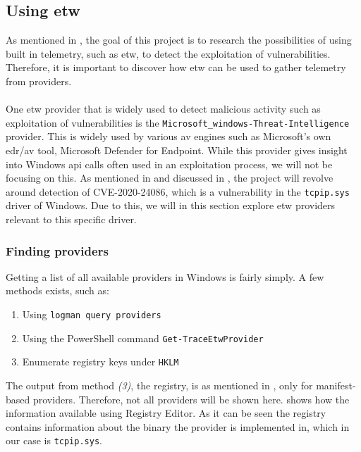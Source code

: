 \documentclass{report}
\begin{document}
\subsection{Using \acrfull{etw}}
\label{cha:etw:constructing-trace-session}
As mentioned in , the goal of this project is to research the possibilities of using built in telemetry, such as \gls{etw}, to detect the exploitation of vulnerabilities. Therefore, it is important to discover how \gls{etw} can be used to gather telemetry from providers.
\\
\\
One \gls{etw} provider that is widely used to detect malicious activity such as exploitation of vulnerabilities is the \texttt{Microsoft_windows-Threat-Intelligence}\cite{url:etw:etwti} provider. This is widely used by various \gls{av} engines such as Microsoft's own \gls{edr}/\gls{av} tool, Microsoft Defender for Endpoint. While this provider gives insight into Windows \gls{api} calls often used in an exploitation process, we will not be focusing on this. As mentioned in  and discussed in , the project will revolve around detection of CVE-2020-24086, which is a vulnerability in the \texttt{tcpip.sys} driver of Windows. Due to this, we will in this section explore \gls{etw} providers relevant to this specific driver.

\subsubsection{Finding providers}
Getting a list of all available providers in Windows is fairly simply. A few methods exists, such as:

\begin{enumerate}
    \item Using \texttt{logman query providers}
    \item Using the PowerShell command \texttt{Get-TraceEtwProvider}
    \item Enumerate registry keys under \texttt{HKLM\SOFTWARE\Microsoft\Windows\CurrentVersion\WINEVT\Publishers}
\end{enumerate}

The output from method \emph{(3)}, the registry, is as mentioned in , only for manifest-based providers. Therefore, not all providers will be shown here.  shows how the information available using Registry Editor. As it can be seen the registry contains information about the binary the provider is implemented in, which in our case is \texttt{tcpip.sys}. 
\end{document}
